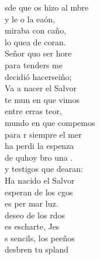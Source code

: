 \documentclass[12pt]{article}
\begin{document}
\begin{multicols*}{2}
\begin{cancion}%
	sde que os hizo al mbre\\
	y le o la eaón,\\
	 miraba con caño,\\
	lo quea de coran. \\
	 Señor quo ser hore\\
	para tenders me \\
	decidió hacerseiño;\\
	Va a nacer el Salvor  \\
\jump
	te mun en que vimos\\
	entre erras teor,\\
	 mundo en que compemos\\
	para r siempre el mer \\
	 ha perdi la espenza  \\
	de quhoy bro una .\\
	y testigos que dearan:\\
	Ha nacido el Salvor  \\
\jump
	 esperan de los cgos\\
	es per mar  luz.\\
	 deseo de los rdos\\
	es escharte, Jes \\
	s sencils, los peeños\\
	desbren tu spland \\

\end{cancion}
\end{multicols*}
\end{document}
